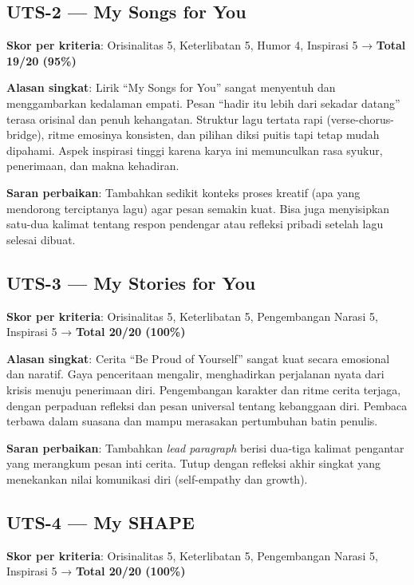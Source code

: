 \documentclass[
  letterpaper,
  DIV=11,
  numbers=noendperiod]{scrreprt}
\begin{document}
\subsection{UTS-2 --- My Songs for You}\label{uts-2-my-songs-for-you-1}

\textbf{Skor per kriteria}: Orisinalitas 5, Keterlibatan 5, Humor 4,
Inspirasi 5 → \textbf{Total 19/20 (95\%)}

\textbf{Alasan singkat}: Lirik ``My Songs for You'' sangat menyentuh dan
menggambarkan kedalaman empati. Pesan ``hadir itu lebih dari sekadar
datang'' terasa orisinal dan penuh kehangatan. Struktur lagu tertata
rapi (verse-chorus-bridge), ritme emosinya konsisten, dan pilihan diksi
puitis tapi tetap mudah dipahami. Aspek inspirasi tinggi karena karya
ini memunculkan rasa syukur, penerimaan, dan makna kehadiran.

\textbf{Saran perbaikan}: Tambahkan sedikit konteks proses kreatif (apa
yang mendorong terciptanya lagu) agar pesan semakin kuat. Bisa juga
menyisipkan satu-dua kalimat tentang respon pendengar atau refleksi
pribadi setelah lagu selesai dibuat.

\subsection{UTS-3 --- My Stories for
You}\label{uts-3-my-stories-for-you-1}

\textbf{Skor per kriteria}: Orisinalitas 5, Keterlibatan 5, Pengembangan
Narasi 5, Inspirasi 5 → \textbf{Total 20/20 (100\%)}

\textbf{Alasan singkat}: Cerita ``Be Proud of Yourself'' sangat kuat
secara emosional dan naratif. Gaya penceritaan mengalir, menghadirkan
perjalanan nyata dari krisis menuju penerimaan diri. Pengembangan
karakter dan ritme cerita terjaga, dengan perpaduan refleksi dan pesan
universal tentang kebanggaan diri. Pembaca terbawa dalam suasana dan
mampu merasakan pertumbuhan batin penulis.

\textbf{Saran perbaikan}: Tambahkan \emph{lead paragraph} berisi
dua-tiga kalimat pengantar yang merangkum pesan inti cerita. Tutup
dengan refleksi akhir singkat yang menekankan nilai komunikasi diri
(self-empathy dan growth).

\subsection{UTS-4 --- My SHAPE}\label{uts-4-my-shape}

\textbf{Skor per kriteria}: Orisinalitas 5, Keterlibatan 5, Pengembangan
Narasi 5, Inspirasi 5 → \textbf{Total 20/20 (100\%)}
\end{document}
